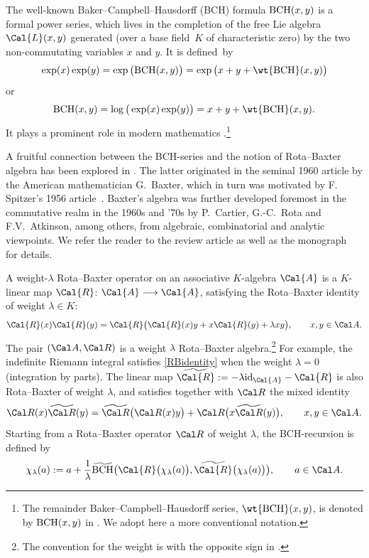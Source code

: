 \documentclass[10pt,a4paper]{amsart}
\numberwithin{equation}{section}
\begin{document}
The well-known Baker--Campbell--Hausdorff (BCH) formula ${\rm BCH}(x, y)$ is a formal power series, which lives in the completion of the free Lie algebra $\Cal{L}(x, y)$ generated (over a base field~$K$ of characteristic zero) by the two non-commutating variables $x$ and $y$. It is defined~by
\begin{displaymath}
\exp(x)\exp(y)= \exp\big( {\rm BCH}(x, y)\big)= \exp\big( x + y+ \wt{{\rm BCH}}(x, y)\big)
\end{displaymath}
or
\begin{displaymath}
{\rm BCH}(x, y)=\log\big( \exp(x)\exp(y)\big)= x + y + \wt{{\rm BCH}}(x, y).
\end{displaymath}
It plays a prominent role in modern mathematics \cite{AAFCCC020,BF12}.\footnote{The remainder Baker--Campbell--Hausdorff series, $\wt{{\rm BCH}}(x,y)$, is denoted by ${\rm BCH}(x,y)$ in \cite{KLM06}. We adopt here a more conventional notation.}

A fruitful connection between the BCH-series and the notion of Rota--Baxter algebra has been explored in \cite{KLK04, KLK05, KLM06}. The latter originated in the seminal 1960 article \cite{B60} by the American mathematician G.~Baxter, which in turn was motivated by F. Spitzer's 1956 article~\cite{Sp56}. Baxter's algebra was further developed foremost in the commutative realm in the 1960s and '70s by P.~Cartier, G.-C.~Rota and F.V.~Atkinson, among others, from algebraic, combinatorial and analytic viewpoints. We refer the reader to the review article \cite{EP19} as well as the monograph~\cite{Guo12} for details.

A weight-$\lambda$ Rota--Baxter operator on an associative $K$-algebra $\Cal{A}$ is a $K$-linear map $\Cal{R}$: \mbox{$\Cal{A} \longrightarrow \Cal{A}$}, satisfying the Rota--Baxter identity of weight $\lambda \in K$:
\begin{equation}
\label{RBidentity}
\Cal{R}(x)\Cal{R}(y)
= \Cal{R} \big(\Cal{R}(x)y + x \Cal{R}(y) + \lambda xy \big), \qquad x,y \in\Cal A.
\end{equation}
The pair $(\Cal A,\Cal R)$ is a weight $\lambda$ Rota--Baxter algebra.\footnote{The convention for the weight is with the opposite sign in \cite{KLM06}.} For example, the indefinite Riemann integral satisfies \eqref{RBidentity} when the weight $\lambda=0$ (integration by parts). The linear map $\widetilde{\Cal{R}} := - \lambda {\rm id}_{\Cal{A}} - \Cal{R}$ is also Rota--Baxter of weight $\lambda$, and satisfies together with $\Cal R$ the mixed identity
\begin{displaymath}
\Cal R(x)\widetilde{\Cal R}(y)
=\widetilde{\Cal R}\big(\Cal R(x)y\big)+\Cal R\big(x\widetilde{\Cal R}(y)\big), \qquad x,y \in\Cal A.
\end{displaymath}
Starting from a Rota--Baxter operator $\Cal R$ of weight $\lambda$, the BCH-recursion \cite{KLM06} is defined by
\begin{equation}\label{rec.1}
\chi_{\lambda}(a) := a + \frac{1}{\lambda} \widetilde{{\rm BCH}}\big(\Cal{R}\big(\chi_{\lambda}(a)\big),
\widetilde{\Cal{R}}\big(\chi_{\lambda}(a)\big)\big),\qquad a\in\Cal A.
\end{equation}
\end{document}

